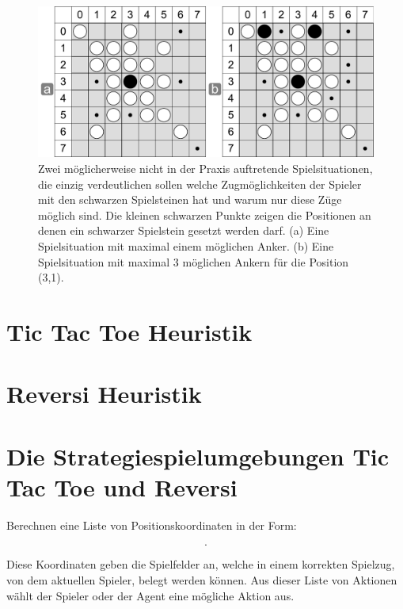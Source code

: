 \begin{figure}[!htbp]
  \centering
  \includegraphics[scale=0.5]{inhalt/abbildungen/zuege_schwarz_reversi.pdf}
  \caption{Zwei möglicherweise nicht in der Praxis auftretende Spielsituationen, die einzig verdeutlichen sollen welche Zugmöglichkeiten der Spieler mit den schwarzen Spielsteinen hat und warum nur diese Züge möglich sind. Die kleinen schwarzen Punkte zeigen die Positionen an denen ein schwarzer Spielstein gesetzt werden darf. (a) Eine Spielsituation mit maximal einem möglichen Anker. (b) Eine Spielsituation mit maximal 3 möglichen Ankern für die Position (3,1).}
  \label{fig:zuege_schwarz_reversi}
\end{figure}


\section{Tic Tac Toe Heuristik}
\label{sec:Tic Tac Toe Heuristik}

\section{Reversi Heuristik}
\label{sec:Reversi Heuristik}

\section{Die Strategiespielumgebungen Tic Tac Toe und Reversi}

Berechnen eine Liste von Positionskoordinaten in der Form: 

\begin{equation*}
[Tupel(X_a Koordinate, Y_b Koordinate), ...].
\end{equation*}

Diese Koordinaten geben die Spielfelder an, welche in einem korrekten Spielzug, von dem aktuellen Spieler, belegt werden können. Aus dieser Liste von Aktionen wählt der Spieler oder der Agent eine mögliche Aktion aus.\\

